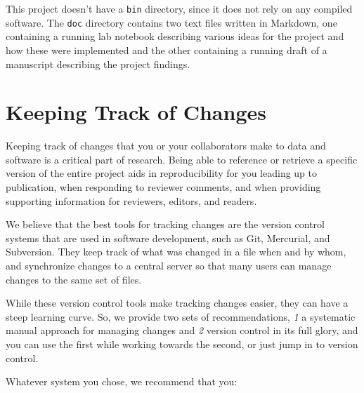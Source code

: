 \documentclass[10pt,letterpaper]{article}
\newcommand{\practicesection}[2]{\section{#1}\label{#2}}
\begin{document}
This project doesn't have a \texttt{bin} directory, since it does not
rely on any compiled software. The \texttt{doc} directory contains two
text files written in Markdown, one containing a running lab notebook
describing various ideas for the project and how these were
implemented and the other containing a running draft of a manuscript
describing the project findings.

\practicesection{Keeping Track of Changes}{sec:versioning}

Keeping track of changes that you or your collaborators make to data
and software is a critical part of research. Being able to reference or
retrieve a specific version of the entire project aids in reproducibility
for you leading up to publication, when responding to reviewer comments,
and when providing supporting information for reviewers, editors,
and readers.

We believe that the best tools for tracking changes are the version
control systems that are used in software development, such as Git,
Mercurial, and Subversion. They keep track of what was changed in a
file when and by whom, and synchronize changes to a central server so
that many users can manage changes to the same set of files.

While these version control tools make tracking changes easier, they
can have a steep learning curve. So, we provide two sets of
recommendations, \emph{1} a systematic manual approach for managing
changes and \emph{2} version control in its full glory, and you can
use the first while working towards the second, or just jump in to
version control.

Whatever system you chose, we recommend that you:
\end{document}
